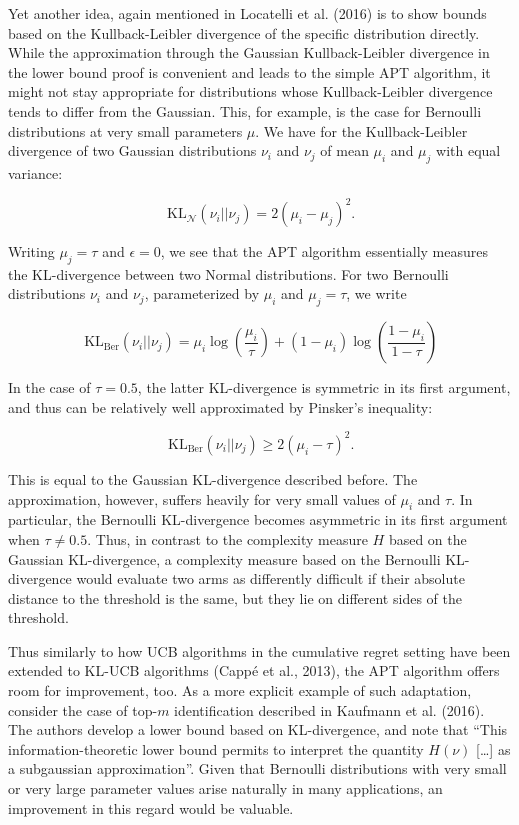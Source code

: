 \documentclass[11pt,]{article}
\newcommand{\KL}{\,\text{KL}}
\begin{document}
Yet another idea, again mentioned in Locatelli et al. (2016) is to show
bounds based on the Kullback-Leibler divergence of the specific
distribution directly. While the approximation through the Gaussian
Kullback-Leibler divergence in the lower bound proof is convenient and
leads to the simple APT algorithm, it might not stay appropriate for
distributions whose Kullback-Leibler divergence tends to differ from the
Gaussian. This, for example, is the case for Bernoulli distributions at
very small parameters \(\mu\). We have for the Kullback-Leibler
divergence of two Gaussian distributions \(\nu_i\) and \(\nu_j\) of mean
\(\mu_i\) and \(\mu_j\) with equal variance:

\[
\KL_{\mathcal{N}}(\nu_i || \nu_j) = 2(\mu_i - \mu_j)^2.
\]

Writing \(\mu_j = \tau\) and \(\epsilon = 0\), we see that the APT
algorithm essentially measures the KL-divergence between two Normal
distributions. For two Bernoulli distributions \(\nu_i\) and \(\nu_j\),
parameterized by \(\mu_i\) and \(\mu_j=\tau\), we write

\[
\KL_{\text{Ber}}(\nu_i||\nu_j) = \mu_i \log(\frac{\mu_i}{\tau}) + (1-\mu_i) \log(\frac{1-\mu_i}{1-\tau})
\]

In the case of \(\tau = 0.5\), the latter KL-divergence is symmetric in
its first argument, and thus can be relatively well approximated by
Pinsker's inequality:

\[
\KL_{\text{Ber}}(\nu_i||\nu_j) \geq 2(\mu_i - \tau)^2.
\]

This is equal to the Gaussian KL-divergence described before. The
approximation, however, suffers heavily for very small values of
\(\mu_i\) and \(\tau\). In particular, the Bernoulli KL-divergence
becomes asymmetric in its first argument when \(\tau \neq 0.5\). Thus,
in contrast to the complexity measure \(H\) based on the Gaussian
KL-divergence, a complexity measure based on the Bernoulli KL-divergence
would evaluate two arms as differently difficult if their absolute
distance to the threshold is the same, but they lie on different sides
of the threshold.

Thus similarly to how UCB algorithms in the cumulative regret setting
have been extended to KL-UCB algorithms (Cappé et al., 2013), the APT
algorithm offers room for improvement, too. As a more explicit example
of such adaptation, consider the case of top-\(m\) identification
described in Kaufmann et al. (2016). The authors develop a lower bound
based on KL-divergence, and note that ``This information-theoretic lower
bound permits to interpret the quantity \(H(\nu)\) {[}\ldots{}{]} as a
subgaussian approximation''. Given that Bernoulli distributions with
very small or very large parameter values arise naturally in many
applications, an improvement in this regard would be valuable.
\end{document}
